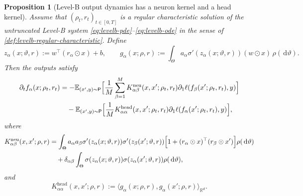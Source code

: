 \documentclass[11pt]{article}
\newtheorem{proposition}[theorem]{Proposition}
\theoremstyle{definition}
\newcommand{\R}{\mathbb{R}}
\newcommand{\E}{\mathbb{E}}
\newcommand{\dd}{\,\mathrm{d}}
\begin{document}
\begin{proposition}[Level-B output dynamics has a neuron kernel and a head kernel]
\label{prop:levelb-dynamics}
Assume that $(\rho_t,r_t)_{t\in[0,T]}$ is a regular characteristic solution of the untruncated Level-B system \eqref{eq:levelb-pde}--\eqref{eq:levelb-ode} in the sense of \cref{def:levelb-regular-characteristic}. Define
\[
  z_\alpha(x;\vartheta,r):=w^\top(r_\alpha\odot x)+b,
  \qquad
  g_\alpha(x;\rho,r)
  :=
  \int_\Theta
  a_\alpha \sigma'(z_\alpha(x;\vartheta,r))(w\odot x)
  \,\rho(\dd \vartheta).
\]
Then the outputs satisfy
\begin{align}
  \partial_t f_\alpha(x;\rho_t,r_t)
  &=
  -\E_{(x',y)\sim\mathsf P}
  \Bigl[
    \frac1M\sum_{\beta=1}^M
    K^{\mathrm{neu}}_{\alpha\beta}(x,x';\rho_t,r_t)
    \partial_1\ell(f_\beta(x';\rho_t,r_t),y)
  \Bigr]
  \nonumber\\
  &\quad
  -
  \E_{(x',y)\sim\mathsf P}
  \Bigl[
    \frac1M
    K^{\mathrm{head}}_{\alpha\alpha}(x,x';\rho_t,r_t)
    \partial_1\ell(f_\alpha(x';\rho_t,r_t),y)
  \Bigr],
  \label{eq:levelb-output-dynamics}
\end{align}
where
\begin{align}
  K^{\mathrm{neu}}_{\alpha\beta}(x,x';\rho,r)
  &=
  \int_\Theta
  a_\alpha a_\beta
  \sigma'(z_\alpha(x;\vartheta,r))
  \sigma'(z_\beta(x';\vartheta,r))
  \Bigl[
    1+(r_\alpha\odot x)^\top (r_\beta\odot x')
  \Bigr]
  \rho(\dd \vartheta)
  \nonumber\\
  &\quad
  +
  \delta_{\alpha\beta}
  \int_\Theta
  \sigma(z_\alpha(x;\vartheta,r))
  \sigma(z_\alpha(x';\vartheta,r))
  \rho(\dd \vartheta),
  \label{eq:levelb-neuron-kernel}
\end{align}
and
\begin{equation}
  K^{\mathrm{head}}_{\alpha\alpha}(x,x';\rho,r)
  :=
  \langle g_\alpha(x;\rho,r),g_\alpha(x';\rho,r)\rangle_{\R^d}.
  \label{eq:levelb-head-kernel}
\end{equation}
\end{proposition}
\end{document}
